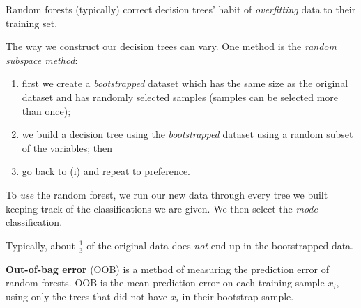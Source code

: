 \begin{remark}
    Random forests (typically) correct decision trees' habit of \emph{overfitting} data to
    their training set.
\end{remark}

The way we construct our decision trees can vary. 
One method is the \emph{random subspace method}:
\begin{enumerate}
    \item first we create a \emph{bootstrapped} dataset which has the
        same size as the original dataset and has randomly selected samples
        (samples can be selected more than once);
    \item we build a decision tree using the \emph{bootstrapped} dataset
        using a random subset of the variables; then
    \item go back to (i) and repeat to preference.
\end{enumerate}
To \emph{use} the random forest, we run our new data through every tree we built
keeping track of the classifications we are given.
We then select the \emph{mode} classification.

\begin{remark}
    Typically, about $\frac13$ of the original data does \emph{not} end up in the
    bootstrapped data.
\end{remark}

\begin{definition}
    \textbf{Out-of-bag error} (OOB) is a method of measuring the prediction error of
    random forests. 
    OOB is the mean prediction error on each training sample $x_i$, using
    only the trees that did not have $x_i$ in their bootstrap sample.
\end{definition}
